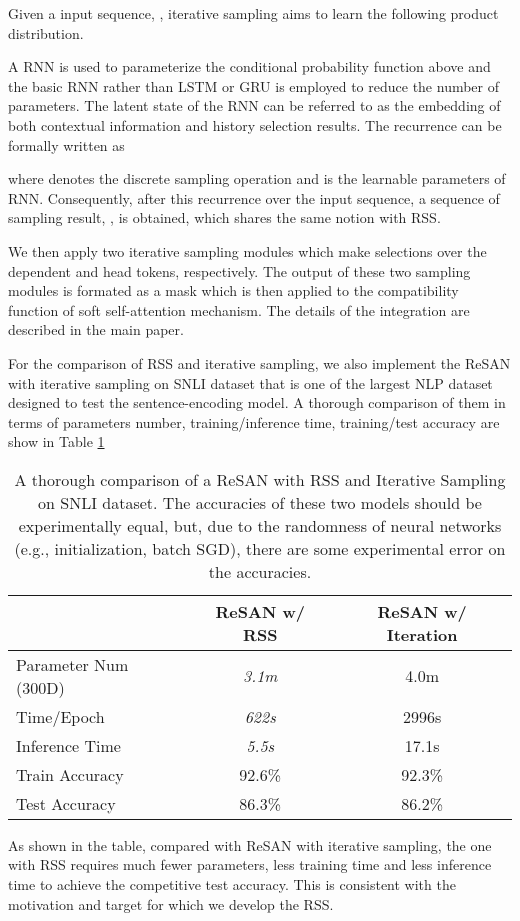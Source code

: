 \documentclass{article}
\begin{document}
Given a input sequence, , iterative sampling aims to learn the following product distribution.

A RNN is used to parameterize the conditional probability function above and the basic RNN rather than LSTM or GRU is employed to reduce the number of parameters. The latent state of the RNN can be referred to as the embedding of both contextual information and history selection results. The recurrence can be formally written as

where  denotes the discrete sampling operation and   is the learnable parameters of RNN. Consequently, after this recurrence over the input sequence, a sequence of sampling result, , is obtained, which shares the same notion with RSS.

We then apply two iterative sampling modules which make selections over the dependent and head tokens, respectively. The output of these two sampling modules is formated as a mask which is then applied to the compatibility function of soft self-attention mechanism. The details of the integration are described in the main paper.

For the comparison of RSS and iterative sampling, we also implement the ReSAN with iterative sampling on SNLI dataset that is one of the largest NLP dataset designed to test the sentence-encoding model. A thorough comparison of them in terms of parameters number, training/inference time, training/test accuracy are show in Table \ref{table:comparison_rss_iter}

\begin{table}[htbp] \small
	\centering
	\setlength{\tabcolsep}{4pt}
	\begin{tabular}{@{}lcc@{}}
		\toprule
		& \textbf{ReSAN w/ RSS} &\textbf{ReSAN w/ Iteration}  \\ \midrule
		Parameter Num (300D)&	\textit{3.1m}&	4.0m\\
		Time/Epoch&	\textit{622s}&	2996s\\ 
		Inference Time&	\textit{5.5s}&	17.1s\\ 
		Train Accuracy&	92.6\%&	92.3\%\\ 
		Test Accuracy&	86.3\%&  86.2\% \\ \bottomrule
	\end{tabular}
	\caption{A thorough comparison of a ReSAN with RSS and Iterative Sampling on SNLI dataset. The accuracies of these two models should be experimentally equal, but, due to the randomness of neural networks (e.g., initialization, batch SGD), there are some experimental error on the accuracies.}
	\label{table:comparison_rss_iter}
\end{table}

As shown in the table, compared with ReSAN with iterative sampling, the one with RSS requires much fewer parameters,  less training time and  less inference time to achieve the competitive test accuracy. This is consistent with the motivation and target for which we develop the RSS.
\end{document}
